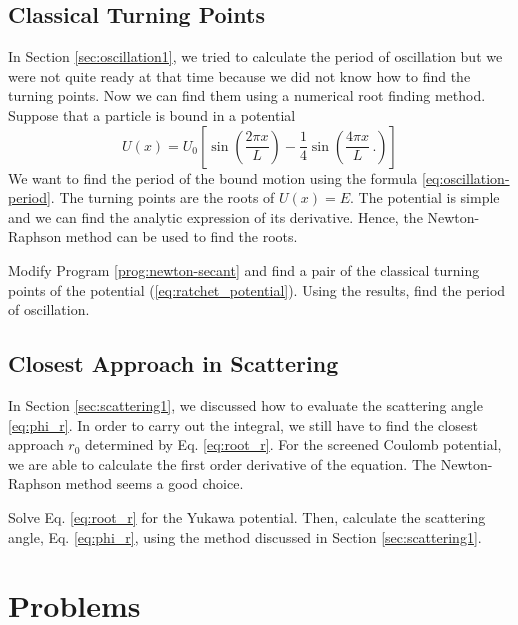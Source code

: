 \noindent
\subsection{Classical Turning Points}

In Section  \ref{sec:oscillation1}, we tried to calculate the period of oscillation but we were not quite ready at that time because we did not know how to find the turning points.  Now we can find them using a numerical root finding method. 
Suppose that a particle is bound in a potential
\begin{equation}
U(x) = U_0 \left [ \sin \left ( \frac{2\pi x}{L} \right )- \frac{1}{4} \sin \left ( \frac{4\pi x}{L}\,. \right ) \right ]
\label{eq:ratchet_potential}
\end{equation}
We want to find the period of the bound motion using the formula 
\eqref{eq:oscillation-period}.
The turning points are the roots of $U(x)=E$. The potential is simple and we can find the analytic expression of its derivative.  Hence, the Newton-Raphson method can be used to find the roots.

\vspace{18px}
\noindent
\exercise
Modify Program \ref{prog:newton-secant} and find a pair of the classical turning points of the potential (\ref{eq:ratchet_potential}).
Using the results, find the period of oscillation.

\noindent
\subsection{Closest Approach in Scattering}

In Section \ref{sec:scattering1},
we discussed how to evaluate the scattering angle \eqref{eq:phi_r}.  In order to carry out the integral, we still have to find the closest approach $r_0$ determined by 
Eq. \eqref{eq:root_r}.
For the screened Coulomb potential, we are able to calculate the first order derivative of the equation.  The Newton-Raphson method seems a good choice.

\vspace{18px}
\noindent
\exercise
Solve Eq.  \eqref{eq:root_r} for the Yukawa potential.  Then, calculate the scattering angle, Eq. \eqref{eq:phi_r}, using the method discussed in Section \ref{sec:scattering1}.

\vfill
\noindent
\section{Problems}

